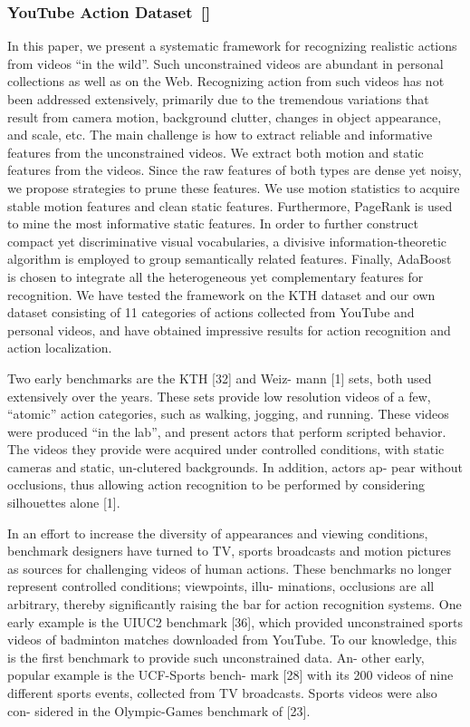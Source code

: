 \subsubsection{YouTube Action Dataset~[\cite{liu_recognizing_2009}]}
In this paper, we present a systematic framework for recognizing realistic actions from videos “in the wild”. Such unconstrained videos are abundant in personal collections as well as on the Web. Recognizing action from such videos has not been addressed extensively, primarily due to the tremendous variations that result from camera motion, background clutter, changes in object appearance, and scale, etc. The main challenge is how to extract reliable and informative features from the unconstrained videos. We extract both motion and static features from the videos. Since the raw features of both types are dense yet noisy, we propose strategies to prune these features. We use motion statistics to acquire stable motion features and clean static features. Furthermore, PageRank is used to mine the most informative static features. In order to further construct compact yet discriminative visual vocabularies, a divisive information-theoretic algorithm is employed to group semantically related features. Finally, AdaBoost is chosen to integrate all the heterogeneous yet complementary features for recognition. We have tested the framework on the KTH dataset and our own dataset consisting of 11 categories of actions collected from YouTube and personal videos, and have obtained impressive results for action recognition and action localization.

Two early benchmarks are the KTH [32] and Weiz-
mann [1] sets, both used extensively over the years. These
sets provide low resolution videos of a few, “atomic” action
categories, such as walking, jogging, and running. These
videos were produced “in the lab”, and present actors that
perform scripted behavior. The videos they provide were
acquired under controlled conditions, with static cameras
and static, un-clutered backgrounds. In addition, actors ap-
pear without occlusions, thus allowing action recognition to
be performed by considering silhouettes alone [1].

In an effort to increase the diversity of appearances and
viewing conditions, benchmark designers have turned to
TV, sports broadcasts and motion pictures as sources for
challenging videos of human actions. These benchmarks
no longer represent controlled conditions; viewpoints, illu-
minations, occlusions are all arbitrary, thereby significantly
raising the bar for action recognition systems.
One early example is the UIUC2 benchmark [36], which
provided unconstrained sports videos of badminton matches
downloaded from YouTube. To our knowledge, this is the
first benchmark to provide such unconstrained data. An-
other early, popular example is the UCF-Sports bench-
mark [28] with its 200 videos of nine different sports events,
collected from TV broadcasts. Sports videos were also con-
sidered in the Olympic-Games benchmark of [23].

